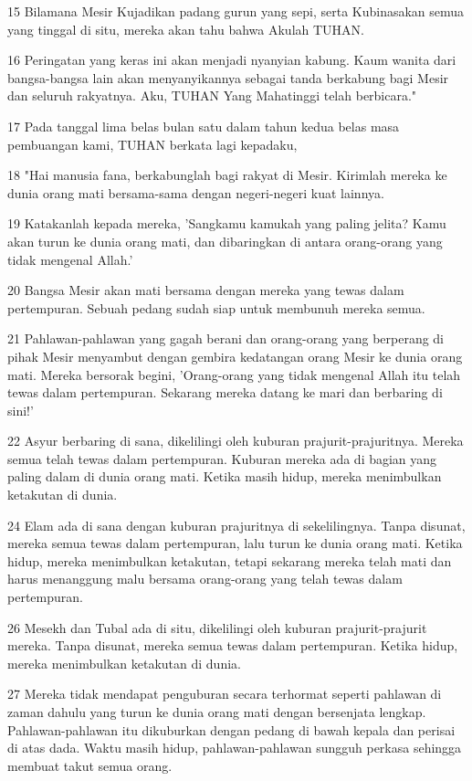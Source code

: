 \par 15 Bilamana Mesir Kujadikan padang gurun yang sepi, serta Kubinasakan semua yang tinggal di situ, mereka akan tahu bahwa Akulah TUHAN.
\par 16 Peringatan yang keras ini akan menjadi nyanyian kabung. Kaum wanita dari bangsa-bangsa lain akan menyanyikannya sebagai tanda berkabung bagi Mesir dan seluruh rakyatnya. Aku, TUHAN Yang Mahatinggi telah berbicara."
\par 17 Pada tanggal lima belas bulan satu dalam tahun kedua belas masa pembuangan kami, TUHAN berkata lagi kepadaku,
\par 18 "Hai manusia fana, berkabunglah bagi rakyat di Mesir. Kirimlah mereka ke dunia orang mati bersama-sama dengan negeri-negeri kuat lainnya.
\par 19 Katakanlah kepada mereka, 'Sangkamu kamukah yang paling jelita? Kamu akan turun ke dunia orang mati, dan dibaringkan di antara orang-orang yang tidak mengenal Allah.'
\par 20 Bangsa Mesir akan mati bersama dengan mereka yang tewas dalam pertempuran. Sebuah pedang sudah siap untuk membunuh mereka semua.
\par 21 Pahlawan-pahlawan yang gagah berani dan orang-orang yang berperang di pihak Mesir menyambut dengan gembira kedatangan orang Mesir ke dunia orang mati. Mereka bersorak begini, 'Orang-orang yang tidak mengenal Allah itu telah tewas dalam pertempuran. Sekarang mereka datang ke mari dan berbaring di sini!'
\par 22 Asyur berbaring di sana, dikelilingi oleh kuburan prajurit-prajuritnya. Mereka semua telah tewas dalam pertempuran. Kuburan mereka ada di bagian yang paling dalam di dunia orang mati. Ketika masih hidup, mereka menimbulkan ketakutan di dunia.
\par 24 Elam ada di sana dengan kuburan prajuritnya di sekelilingnya. Tanpa disunat, mereka semua tewas dalam pertempuran, lalu turun ke dunia orang mati. Ketika hidup, mereka menimbulkan ketakutan, tetapi sekarang mereka telah mati dan harus menanggung malu bersama orang-orang yang telah tewas dalam pertempuran.
\par 26 Mesekh dan Tubal ada di situ, dikelilingi oleh kuburan prajurit-prajurit mereka. Tanpa disunat, mereka semua tewas dalam pertempuran. Ketika hidup, mereka menimbulkan ketakutan di dunia.
\par 27 Mereka tidak mendapat penguburan secara terhormat seperti pahlawan di zaman dahulu yang turun ke dunia orang mati dengan bersenjata lengkap. Pahlawan-pahlawan itu dikuburkan dengan pedang di bawah kepala dan perisai di atas dada. Waktu masih hidup, pahlawan-pahlawan sungguh perkasa sehingga membuat takut semua orang.
